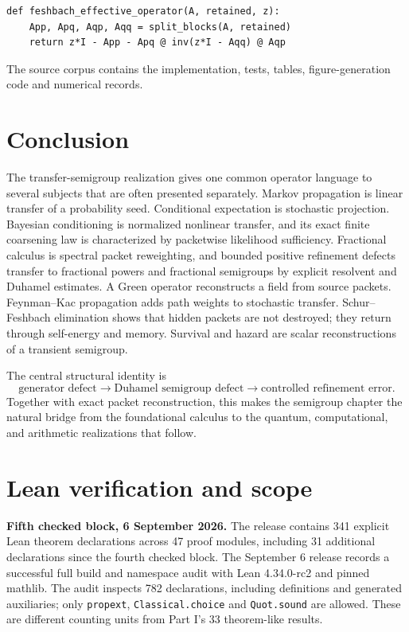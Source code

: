 \documentclass[11pt,letterpaper]{article}
\theoremstyle{plain}
\theoremstyle{plain}
\theoremstyle{plain}
\theoremstyle{definition}
\theoremstyle{definition}
\theoremstyle{definition}
\theoremstyle{definition}
\theoremstyle{definition}
\theoremstyle{remark}
\theoremstyle{remark}
\theoremstyle{remark}
\theoremstyle{remark}
\theoremstyle{remark}
\theoremstyle{remark}
\begin{document}
\begin{lstlisting}[caption={Finite Schur-Feshbach effective operator.}]
def feshbach_effective_operator(A, retained, z):
    App, Apq, Aqp, Aqq = split_blocks(A, retained)
    return z*I - App - Apq @ inv(z*I - Aqq) @ Aqp
\end{lstlisting}

The source corpus contains the implementation, tests, tables, figure-generation code and numerical records.

\FloatBarrier
\section{Conclusion}\label{core:section:19}

The transfer-semigroup realization gives one common operator language to several subjects that are often presented separately. Markov propagation is linear transfer of a probability seed. Conditional expectation is stochastic projection. Bayesian conditioning is normalized nonlinear transfer, and its exact finite coarsening law is characterized by packetwise likelihood sufficiency. Fractional calculus is spectral packet reweighting, and bounded positive refinement defects transfer to fractional powers and fractional semigroups by explicit resolvent and Duhamel estimates. A Green operator reconstructs a field from source packets. Feynman--Kac propagation adds path weights to stochastic transfer. Schur--Feshbach elimination shows that hidden packets are not destroyed; they return through self-energy and memory. Survival and hazard are scalar reconstructions of a transient semigroup.

The central structural identity is
\[
\boxed{
\text{generator defect}
\longrightarrow
\text{Duhamel semigroup defect}
\longrightarrow
\text{controlled refinement error}.
}
\]
Together with exact packet reconstruction, this makes the semigroup chapter the natural bridge from the foundational calculus to the quantum, computational, and arithmetic realizations that follow.

\clearpage
\appendix
\FloatBarrier
\section{Lean verification and scope}\label{core:section:20}\label{core:sec:lean-status}
\noindent\textbf{Fifth checked block, 6 September 2026.}
The release contains 341 explicit Lean theorem declarations across 47 proof modules,
including 31 additional declarations since the fourth checked block. The September 6 release records a successful full
build and namespace audit with Lean 4.34.0-rc2 and pinned mathlib. The audit
inspects 782 declarations, including definitions and generated auxiliaries; only
\texttt{propext}, \texttt{Classical.choice} and \texttt{Quot.sound} are allowed.
These are different counting units from Part I's 33 theorem-like results.
\end{document}
